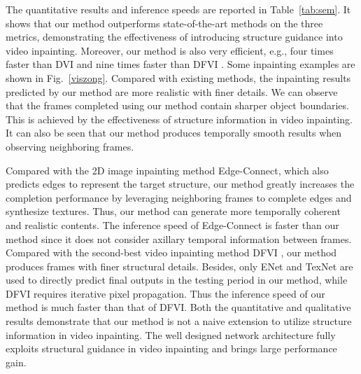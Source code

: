 The quantitative results and inference speeds are reported in Table~\ref{tab:sem}.
It shows that our method outperforms state-of-the-art methods on the three metrics, demonstrating the effectiveness of introducing structure guidance into video inpainting.
Moreover, our method is also very efficient, e.g., four times faster than DVI \cite{Kim_2019_CVPR1} and nine times faster than DFVI \cite{Xu_2019_CVPR}. 
Some inpainting examples are shown in Fig.~\ref{viszong}.
Compared with existing methods, the inpainting results predicted by our method are more realistic with finer details. 
We can observe that the frames completed using our method contain sharper object boundaries. This is achieved by the effectiveness of structure information in video inpainting.
%
It can also be seen that our method produces temporally smooth results when observing neighboring frames. 


Compared with the 2D image inpainting method Edge-Connect\cite{nazeri2019edgeconnect},
which also predicts edges to represent the target structure,
our method greatly increases the completion performance by leveraging neighboring frames to complete edges and synthesize textures. 
Thus, our method can generate more temporally coherent and realistic contents. The inference speed of Edge-Connect is faster than our method since it does not consider axillary temporal information between frames. 
%
Compared with the second-best video inpainting method DFVI \cite{Xu_2019_CVPR}, our method produces frames with finer structural details. Besides, only ENet and TexNet are used to directly predict final outputs in the testing period in our method, while DFVI requires iterative pixel propagation. Thus the inference speed of our method is much faster than that of DFVI.
%
Both the quantitative and qualitative results demonstrate that our method is not a naive extension to utilize structure information in video inpainting.
The well designed network architecture fully exploits structural guidance in video inpainting and brings large performance gain.




